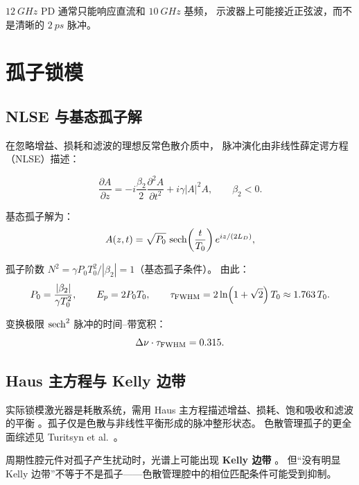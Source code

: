 \documentclass[11pt,a4paper]{article}
\newcommand{\gvd}{\beta_2}
\newcommand{\spm}{\gamma}
\begin{document}
$\SI{12}{GHz}$ PD 通常只能响应直流和 $\SI{10}{GHz}$ 基频，
示波器上可能接近正弦波，而不是清晰的 $\SI{2}{ps}$ 脉冲。

\section{孤子锁模}

\subsection{NLSE 与基态孤子解}

在忽略增益、损耗和滤波的理想反常色散介质中，
脉冲演化由非线性薛定谔方程（NLSE）描述：

\begin{equation}\label{eq:nlse_soliton}
\frac{\partial A}{\partial z}
= -i\frac{\gvd}{2}\frac{\partial^2 A}{\partial t^2}
+ i\spm|A|^2 A,
\qquad \gvd < 0.
\end{equation}

基态孤子解为：
\begin{equation}\label{eq:fundamental_soliton}
A(z,t) = \sqrt{P_0}\,\sech\!\left(\frac{t}{T_0}\right)e^{iz/(2L_D)},
\end{equation}

孤子阶数 $N^2 = \gamma P_0 T_0^2/|\gvd| = 1$（基态孤子条件）。
由此：
\begin{equation}\label{eq:soliton_relations}
P_0 = \frac{|\gvd|}{\spm T_0^2},
\qquad
E_p = 2P_0 T_0,
\qquad
\tau_{\rm FWHM} = 2\ln(1+\sqrt{2})\,T_0 \approx 1.763\,T_0.
\end{equation}

变换极限 $\sech^2$ 脉冲的时间--带宽积：
\begin{equation}\label{eq:soliton_tbp}
\Delta\nu \cdot \tau_{\rm FWHM} = 0.315.
\end{equation}

\subsection{Haus 主方程与 Kelly 边带}

实际锁模激光器是耗散系统，需用 Haus 主方程描述增益、损耗、饱和吸收和滤波的平衡
\cite{Haus2000,Ippen1994}。孤子仅是色散与非线性平衡形成的脉冲整形状态。
色散管理孤子的更全面综述见 Turitsyn et al.\ \cite{Turitsyn2012}。

周期性腔元件对孤子产生扰动时，光谱上可能出现 \textbf{Kelly 边带} \cite{Kelly1992}。
但“没有明显 Kelly 边带”不等于不是孤子——色散管理腔中的相位匹配条件可能受到抑制。
\end{document}
